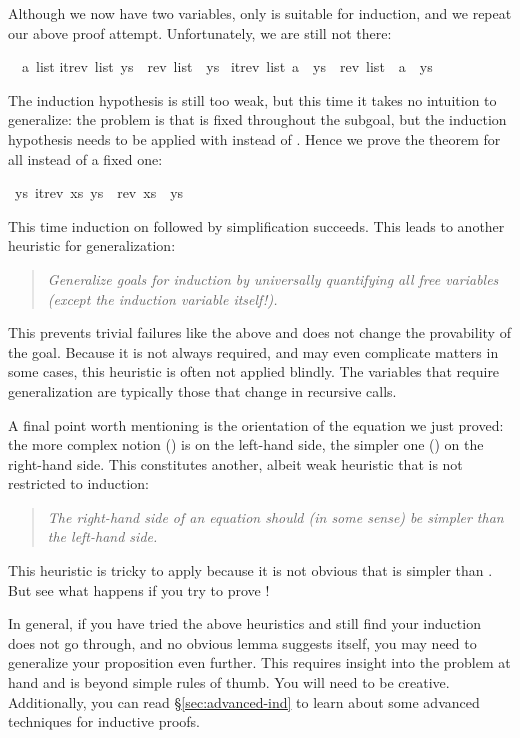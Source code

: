 \begin{isabellebody}
\begin{isamarkuptxt}
Although we now have two variables, only  is suitable for
induction, and we repeat our above proof attempt. Unfortunately, we are still
not there:
\begin{isabelle}%
\ {}{\isachardot}\ {\isasymAnd}a\ list{\isachardot}\isanewline
{}itrev\ list\ ys\ {\isacharequal}\ rev\ list\ {\isacharat}\ ys\ {\isasymLongrightarrow}\isanewline
{}itrev\ list\ {\isacharparenleft}a\ {\isacharhash}\ ys{\isacharparenright}\ {\isacharequal}\ rev\ list\ {\isacharat}\ a\ {\isacharhash}\ ys%
\end{isabelle}
The induction hypothesis is still too weak, but this time it takes no
intuition to generalize: the problem is that  is fixed throughout
the subgoal, but the induction hypothesis needs to be applied with
 instead of . Hence we prove the theorem
for all  instead of a fixed one:%
\end{isamarkuptxt}%
\ {\isachardoublequote}{\isasymforall}ys{\isachardot}\ itrev\ xs\ ys\ {\isacharequal}\ rev\ xs\ {\isacharat}\ ys{\isachardoublequote}%
\begin{isamarkuptext}%
\noindent
This time induction on  followed by simplification succeeds. This
leads to another heuristic for generalization:
\begin{quote}
\emph{Generalize goals for induction by universally quantifying all free
variables {\em(except the induction variable itself!)}.}
\end{quote}
This prevents trivial failures like the above and does not change the
provability of the goal. Because it is not always required, and may even
complicate matters in some cases, this heuristic is often not
applied blindly.
The variables that require generalization are typically those that 
change in recursive calls.

A final point worth mentioning is the orientation of the equation we just
proved: the more complex notion () is on the left-hand
side, the simpler one () on the right-hand side. This constitutes
another, albeit weak heuristic that is not restricted to induction:
\begin{quote}
  \emph{The right-hand side of an equation should (in some sense) be simpler
    than the left-hand side.}
\end{quote}
This heuristic is tricky to apply because it is not obvious that
 is simpler than . But see what
happens if you try to prove !

In general, if you have tried the above heuristics and still find your
induction does not go through, and no obvious lemma suggests itself, you may
need to generalize your proposition even further. This requires insight into
the problem at hand and is beyond simple rules of thumb.  You
will need to be creative. Additionally, you can read \S\ref{sec:advanced-ind}
to learn about some advanced techniques for inductive proofs.%
\end{isamarkuptext}%
\end{isabellebody}%
